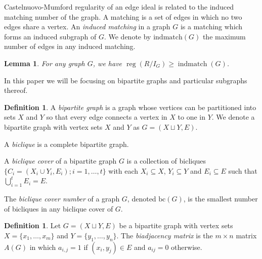 \documentclass[11pt,letterpaper, reqno]{amsart}
\newtheorem{lemma}[theorem]{Lemma}
\theoremstyle{definition}
\newtheorem{definition}[theorem]{Definition}
\theoremstyle{remark}
\DeclareMathOperator{\reg}{reg}
\DeclareMathOperator{\indmatch}{indmatch}
\numberwithin{equation}{section}
\begin{document}
Castelnuovo-Mumford regularity of an edge ideal is related to the induced matching number of the graph. A matching is a set of edges in which no two edges share a vertex. An \textit{induced matching }in a graph $G$ is a matching which forms an induced subgraph of $G$. We denote by $\text{indmatch}(G)$ the maximum number of edges in any induced matching. 
\begin{lemma}\cite[Lem.\,2.2]{Katzman}\label{lem:indmatch}
For any graph $G$, we have $\reg(R/I_G)\geq \indmatch(G)$.
\end{lemma}


In this paper we will be focusing on bipartite graphs and particular subgraphs thereof. 


\begin{definition}\label{def:biclique}
A \textit{bipartite graph} is a graph whose vertices can be partitioned into sets $X$ and  $Y$  so that every edge connects a vertex in $X$ to one in $Y$.  We denote a bipartite graph with vertex sets $X$ and $Y$ as $G=(X\sqcup Y,E)$.

\noindent A \textit{biclique} is a complete bipartite graph.

\noindent A \textit{biclique cover} of a bipartite graph $G$ is a collection of bicliques $\{C_i =(X_i\cup Y_i, E_i); i = 1,\ldots, t\}$ with each $X_i\subseteq X$, $Y_i\subseteq Y$ and $E_i\subseteq E$ such that $\bigcup_{i=1}^t E_i = E$.

\noindent The \textit{biclique cover number} of a graph $G$, denoted $\text{bc}(G)$, is the smallest number of bicliques in any biclique cover of $G$.  

\end{definition}


\begin{definition}
Let $G=(X\sqcup Y,E)$ be a bipartite graph with vertex sets $X=\{x_1,\ldots,x_m\}$ and $Y= \{y_1,\ldots,y_n\}$.  The \textit{biadjacency matrix} is the $m\times n$ matrix $A(G)$ in which $a_{i,j} = 1$ if $(x_i, y_j) \in E$ and $a_{ij}=0$ otherwise.
\end{definition}

\end{document}
